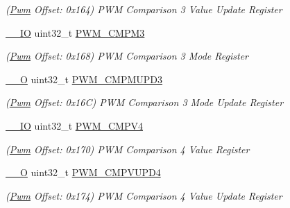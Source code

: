 \begin{DoxyCompactItemize}
\begin{DoxyCompactList}\small\item\em (\mbox{\hyperlink{structPwm}{Pwm}} Offset\+: 0x164) P\+WM Comparison 3 Value Update Register \end{DoxyCompactList}\item 
\mbox{\label{structPwm_a798064b3dc17d2252b2e60e82bc04231}} 
\mbox{\hyperlink{core__cm7_8h_aec43007d9998a0a0e01faede4133d6be}{\+\_\+\+\_\+\+IO}} uint32\+\_\+t \mbox{\hyperlink{structPwm_a798064b3dc17d2252b2e60e82bc04231}{P\+W\+M\+\_\+\+C\+M\+P\+M3}}
\begin{DoxyCompactList}\small\item\em (\mbox{\hyperlink{structPwm}{Pwm}} Offset\+: 0x168) P\+WM Comparison 3 Mode Register \end{DoxyCompactList}\item 
\mbox{\label{structPwm_a61d530184678d63a84812ef950ed3f46}} 
\mbox{\hyperlink{core__cm7_8h_a7e25d9380f9ef903923964322e71f2f6}{\+\_\+\+\_\+O}} uint32\+\_\+t \mbox{\hyperlink{structPwm_a61d530184678d63a84812ef950ed3f46}{P\+W\+M\+\_\+\+C\+M\+P\+M\+U\+P\+D3}}
\begin{DoxyCompactList}\small\item\em (\mbox{\hyperlink{structPwm}{Pwm}} Offset\+: 0x16C) P\+WM Comparison 3 Mode Update Register \end{DoxyCompactList}\item 
\mbox{\label{structPwm_a414a2c00bf277e079bd5c9d5dbddda15}} 
\mbox{\hyperlink{core__cm7_8h_aec43007d9998a0a0e01faede4133d6be}{\+\_\+\+\_\+\+IO}} uint32\+\_\+t \mbox{\hyperlink{structPwm_a414a2c00bf277e079bd5c9d5dbddda15}{P\+W\+M\+\_\+\+C\+M\+P\+V4}}
\begin{DoxyCompactList}\small\item\em (\mbox{\hyperlink{structPwm}{Pwm}} Offset\+: 0x170) P\+WM Comparison 4 Value Register \end{DoxyCompactList}\item 
\mbox{\label{structPwm_a9e259f1becc6dfd7c7696f1438e3e4fb}} 
\mbox{\hyperlink{core__cm7_8h_a7e25d9380f9ef903923964322e71f2f6}{\+\_\+\+\_\+O}} uint32\+\_\+t \mbox{\hyperlink{structPwm_a9e259f1becc6dfd7c7696f1438e3e4fb}{P\+W\+M\+\_\+\+C\+M\+P\+V\+U\+P\+D4}}
\begin{DoxyCompactList}\small\item\em (\mbox{\hyperlink{structPwm}{Pwm}} Offset\+: 0x174) P\+WM Comparison 4 Value Update Register \end{DoxyCompactList}\item 

\end{DoxyCompactItemize}
